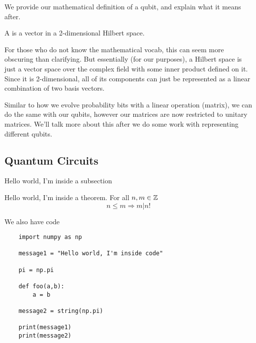 We provide our mathematical definition of a qubit, and explain what it means after.
\begin{definition}
    A  is a vector in a 2-dimensional Hilbert space.
\end{definition}

For those who do not know the mathematical vocab,
this can seem more obscuring than clarifying.
But essentially (for our purposes),
a Hilbert space is just a vector space over the complex field
with some inner product defined on it.
Since it is 2-dimensional,
all of its components can just be represented as a linear combination of two basis vectors.

Similar to how we evolve probability bits with a linear operation (matrix),
we can do the same with our qubits,
however our matrices are now restricted to unitary matrices.
We'll talk more about this after we do some work with representing different qubits.


\subsection{Quantum Circuits}

Hello world, I'm inside a subsection


\begin{theorem}
    Hello world, I'm inside a theorem.
    For all $n,m\in\mathbb Z$
    \[ n \leq m \Rightarrow m|n!\]
\end{theorem}

We also have code

\begin{lstlisting}
    import numpy as np

    message1 = "Hello world, I'm inside code"

    pi = np.pi

    def foo(a,b):
        a = b
    
    message2 = string(np.pi)

    print(message1)
    print(message2)
\end{lstlisting}
